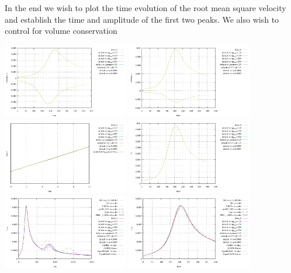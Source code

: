 In the end we wish to plot the time evolution of the root mean square velocity and 
establish the time and amplitude of the first two peaks. We also wish to control 
for volume conservation 


\begin{center}
\includegraphics[width=5.5cm]{python_codes/fieldstone_95/results/u}
\includegraphics[width=5.5cm]{python_codes/fieldstone_95/results/v}\\
\includegraphics[width=5.5cm]{python_codes/fieldstone_95/results/v_start}
\includegraphics[width=5.5cm]{python_codes/fieldstone_95/results/vel}\\
\includegraphics[width=5.5cm]{python_codes/fieldstone_95/results/vrms2000}
\includegraphics[width=5.5cm]{python_codes/fieldstone_95/results/vrms400}\\

\end{center}
